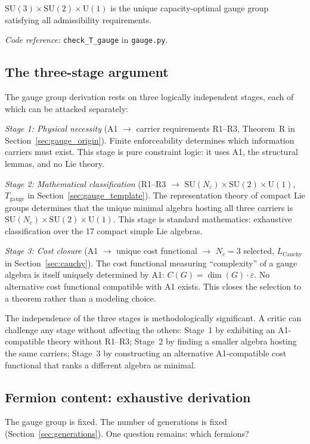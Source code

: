 \documentclass[11pt]{article}
\newcommand{\coderef}[2]{\smallskip\noindent\textit{Code reference:} \texttt{#1} in \texttt{#2}.}
\newcommand{\SU}{\mathrm{SU}}
\newcommand{\U}{\mathrm{U}}
\begin{document}
$\SU(3) \times \SU(2) \times \U(1)$ is the unique capacity-optimal gauge group satisfying all admissibility requirements.

\coderef{check\_T\_gauge}{gauge.py}

\subsection{The three-stage argument}

The gauge group derivation rests on three logically independent stages, each of which can be attacked separately:

\textit{Stage 1: Physical necessity} (A1 $\to$ carrier requirements R1--R3, Theorem~R in Section~\ref{sec:gauge_origin}).  Finite enforceability determines which information carriers must exist.  This stage is pure constraint logic: it uses A1, the structural lemmas, and no Lie theory.

\textit{Stage 2: Mathematical classification} (R1--R3 $\to$ $\SU(N_c) \times \SU(2) \times \U(1)$, $T_{\mathrm{gauge}}$ in Section~\ref{sec:gauge_template}).  The representation theory of compact Lie groups determines that the unique minimal algebra hosting all three carriers is $\SU(N_c) \times \SU(2) \times \U(1)$.  This stage is standard mathematics: exhaustive classification over the 17 compact simple Lie algebras.

\textit{Stage 3: Cost closure} (A1 $\to$ unique cost functional $\to$ $N_c = 3$ selected, $L_{\mathrm{Cauchy}}$ in Section~\ref{sec:cauchy}).  The cost functional measuring ``complexity'' of a gauge algebra is itself uniquely determined by A1: $C(G) = \dim(G) \cdot \varepsilon$.  No alternative cost functional compatible with A1 exists.  This closes the selection to a theorem rather than a modeling choice.

The independence of the three stages is methodologically significant.  A critic can challenge any stage without affecting the others: Stage~1 by exhibiting an A1-compatible theory without R1--R3; Stage~2 by finding a smaller algebra hosting the same carriers; Stage~3 by constructing an alternative A1-compatible cost functional that ranks a different algebra as minimal.

\subsection{Fermion content: exhaustive derivation}

The gauge group is fixed.  The number of generations is fixed (Section~\ref{sec:generations}).  One question remains: which fermions?
\end{document}
